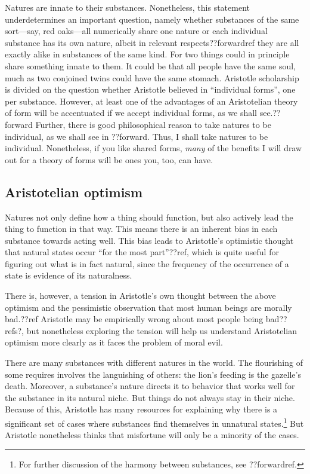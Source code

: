 Natures are innate to their substances. Nonetheless, this statement underdetermines an important question, namely whether 
substances of the same sort---say, red oaks---all numerically share one nature or each individual substance has its own nature, 
albeit in relevant respects??forwardref they are all exactly alike in substances of the same kind. For two things could in
principle share something innate to them. It could be that all people have the same soul, much as two conjoined twins could
have the same stomach. Aristotle scholarship is divided on the question whether Aristotle believed in ``individual forms'',
one per substance. However, at least one of the advantages of an Aristotelian theory of form will be accentuated if we accept individual
forms, as we shall see.??forward  Further, there is good
philosophical reason to take natures to be individual, as we shall see in ??forward. 
Thus, I shall take natures to be individual. 
Nonetheless, if you like shared forms, 
\textit{many} of the benefits I will draw out for a theory of forms will be ones you, too, can have. 

\subsection{Aristotelian optimism}
Natures not only define how a thing should function, but also actively lead the thing to function in that way.
This means there is an inherent bias in each substance towards acting well. This bias leads to Aristotle's
optimistic thought that natural states occur ``for the most part''??ref, which is quite useful for figuring out
what is in fact natural, since the frequency of the occurrence of a state is evidence of its naturalness.

There is, however, a tension in Aristotle's own thought between the above optimism and the pessimistic observation 
that most human beings are morally bad.??ref Aristotle may be empirically wrong about most people being bad??refs?,
but nonetheless exploring the tension will help us understand Aristotelian optimism more clearly as it faces the
problem of moral evil.

There are many substances with different natures in the world. The flourishing of some requires involves the languishing
of others: the lion's feeding is the gazelle's death. Moreover, a substance's nature directs it to behavior that works
well for the substance in its natural niche. But things do not always stay in their niche. Because of this, Aristotle
has many resources for explaining why there is a significant set of cases where substances find themselves in unnatural
states.\footnote{For further discussion of the harmony between substances, see ??forwardref.} But Aristotle nonetheless
thinks that misfortune will only be a minority of the cases.

